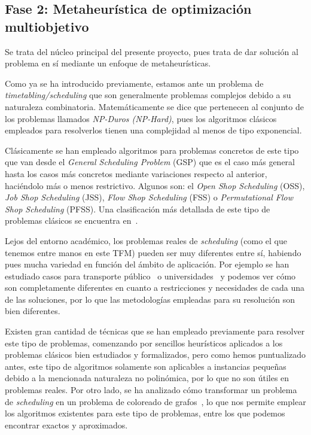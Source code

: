 \subsection{Fase 2: Metaheurística de optimización multiobjetivo} \label{sec:3:metaheurística}
Se trata del núcleo principal del presente proyecto, pues trata de dar solución al problema en sí mediante un enfoque de metaheurísticas.

Como ya se ha introducido previamente, estamos ante un problema de \textit{timetabling/scheduling} que son generalmente problemas complejos debido a su naturaleza combinatoria.
Matemáticamente se dice que pertenecen al conjunto de los problemas llamados \textit{NP-Duros (NP-Hard)}, pues los algoritmos clásicos empleados para resolverlos tienen una complejidad al menos de tipo exponencial.

Clásicamente se han empleado algoritmos para problemas concretos de este tipo que van desde el \textit{General Scheduling Problem} (GSP) que es el caso más general hasta los casos más concretos mediante variaciones respecto al anterior, haciéndolo más o menos restrictivo.
Algunos son: el \textit{Open Shop Scheduling} (OSS), \textit{Job Shop Scheduling} (JSS), \textit{Flow Shop Scheduling} (FSS) o \textit{Permutational Flow Shop Scheduling} (PFSS). Una clasificación más detallada de este tipo de problemas clásicos se encuentra en~\cite{sota:tesis-doctoral}.

Lejos del entorno académico, los problemas reales de \textit{scheduling} (como el que tenemos entre manos en este TFM) pueden ser muy diferentes entre sí, habiendo pues mucha variedad en función del ámbito de aplicación.
Por ejemplo se han estudiado casos para transporte público~\cite{sota:transporte-publico} o universidades~\cite{sota:universidad} y podemos ver cómo son completamente diferentes en cuanto a restricciones y necesidades de cada una de las soluciones, por lo que las metodologías empleadas para su resolución son bien diferentes.

Existen gran cantidad de técnicas que se han empleado previamente para resolver este tipo de problemas, comenzando por sencillos heurísticos aplicados a los problemas clásicos bien estudiados y formalizados, pero como hemos puntualizado antes, este tipo de algoritmos solamente son aplicables a instancias pequeñas debido a la mencionada naturaleza no polinómica, por lo que no son útiles en problemas reales. Por otro lado, se ha analizado cómo transformar un problema de \textit{scheduling} en un problema de coloreado de grafos~\cite{sota:estudio-coloreado-grafos, sota:algotimo-coloreado-grafos}, lo que nos permite emplear los algoritmos existentes para este tipo de problemas, entre los que podemos encontrar exactos y aproximados.

